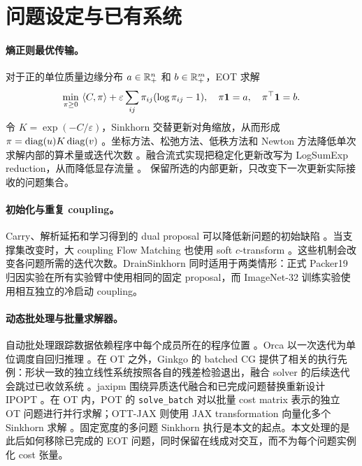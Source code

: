 \section{问题设定与已有系统}
\label{sec:setting-related}

\paragraph{熵正则最优传输。}
对于正的单位质量边缘分布 $a\in\mathbb{R}_+^n$ 和 $b\in\mathbb{R}_+^m$，EOT 求解
\begin{equation}
\min_{\pi\geq0}\ \langle C,\pi\rangle
+\varepsilon\sum_{ij}\pi_{ij}(\log\pi_{ij}-1),\quad
\pi\mathbf{1}=a,\quad\pi^\top\mathbf{1}=b.
\label{eq:eot}
\end{equation}
令 $K=\exp(-C/\varepsilon)$，Sinkhorn 交替更新对角缩放，从而形成 $\pi=\operatorname{diag}(u)K\operatorname{diag}(v)$ \citep{cuturi2013sinkhorn}。坐标方法、松弛方法、低秩方法和 Newton 方法降低单次求解内部的算术量或迭代次数 \citep{altschuler2017near,thibault2017overrelaxed,scetbon2021lowrank,kemertas2025truncated}。融合流式实现把稳定化更新改写为 LogSumExp reduction，从而降低显存流量 \citep{ye2026flashsinkhorn}。\policy{} 保留所选的内部更新，只改变下一次更新实际接收的问题集合。

\paragraph{初始化与重复 coupling。}
Carry、解析延拓和学习得到的 dual proposal 可以降低新问题的初始缺陷 \citep{amos2023meta,thornton2023initialization}。当支撑集改变时，大 coupling Flow Matching 也使用 soft $c$-transform \citep{zhang2025large}。这些机制会改变各问题所需的迭代次数。DrainSinkhorn 同时适用于两类情形：正式 Packer19 归因实验在所有实验臂中使用相同的固定 proposal，而 ImageNet-32 训练实验使用相互独立的冷启动 coupling。

\paragraph{动态批处理与批量求解器。}
自动批处理跟踪数据依赖程序中每个成员所在的程序位置 \citep{radul2020autobatching}。Orca 以一次迭代为单位调度自回归推理 \citep{yu2022orca}。在 OT 之外，Ginkgo 的 batched CG 提供了相关的执行先例：形状一致的独立线性系统按照各自的残差检验退出，融合 solver 的后续迭代会跳过已收敛系统 \citep{ginkgoBatched}。jaxipm 围绕异质迭代融合和已完成问题替换重新设计 IPOPT \citep{viljoen2026jaxipm}。在 OT 内，POT 的 \texttt{solve\_batch} 对以批量 cost matrix 表示的独立 OT 问题进行并行求解；OTT-JAX 则使用 JAX transformation 向量化多个 Sinkhorn 求解 \citep{flamary2021pot,pot2025batch,cuturi2022ott}。固定宽度的多问题 Sinkhorn 执行是本文的起点。本文处理的是此后如何移除已完成的 EOT 问题，同时保留在线成对交互，而不为每个问题实例化 cost 张量。

